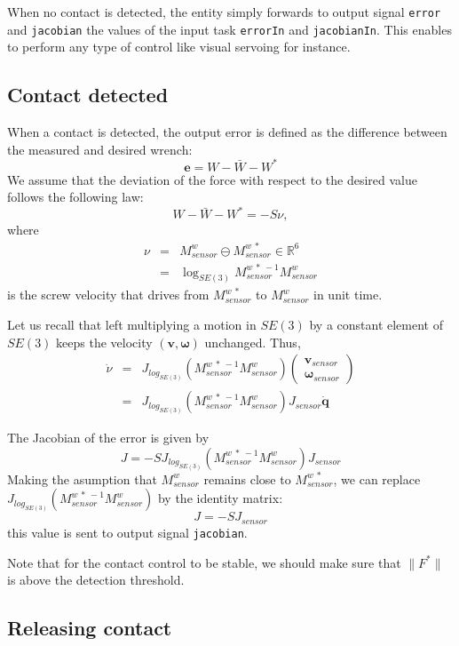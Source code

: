 \documentclass{article}
\newcommand{\oM}[2]{M^{#1}_{#2}}
\newcommand\wrench{W}
\newcommand\wrenchdes{W^{*}}
\newcommand\wrenchOffset{\bar{W}}
\newcommand\resultantdes{F^{*}}
\newcommand\dconf{\mathbf{\dot{q}}}
\begin{document}
When no contact is detected, the entity simply forwards to output signal
\texttt{error} and \texttt{jacobian} the values of the input task \texttt{errorIn} and \texttt{jacobianIn}. This enables to perform any type of control like visual servoing for instance.

\subsection{Contact detected}\label{subsec:contact detected}

When a contact is detected, the output error is defined as the difference between the measured and desired wrench:
$$
\bm{e} = \wrench - \wrenchOffset - \wrenchdes
$$
We assume that the deviation of the force with respect to the desired value follows the following law:
$$
\wrench - \wrenchOffset - \wrenchdes = -S\nu,
$$
where
\begin{eqnarray*}
  \nu &=& \oM{w}{sensor} \ominus \oM{w\ *}{sensor}\in\mathbb{R}^{6}\\
  &=& \log_{SE(3)} \oM{w\ *\ -1}{sensor} \oM{w}{sensor}
\end{eqnarray*}
is the screw velocity that drives from $\oM{w\ *}{sensor}$ to $\oM{w}{sensor}$ in unit time.

Let us recall that left multiplying a motion in $SE(3)$ by a constant element of $SE(3)$ keeps the velocity $(\mathbf{v},\bm{\omega})$ unchanged. Thus,
\begin{eqnarray*}
  \dot{\nu} &=& J_{log_{SE(3)}}(\oM{w\ *\ -1}{sensor} \oM{w}{sensor})\left(\begin{array}{c}\mathbf{v}_{sensor}\\ \bm{\omega}_{sensor}\end{array}\right)\\
  &=& J_{log_{SE(3)}}(\oM{w\ *\ -1}{sensor} \oM{w}{sensor}) J_{sensor}\dconf
\end{eqnarray*}

The Jacobian of the error is given by
$$
J = -S J_{log_{SE(3)}}(\oM{w\ *\ -1}{sensor} \oM{w}{sensor}) J_{sensor}
$$
Making the asumption that $\oM{w}{sensor}$ remains close to $\oM{w\ *}{sensor}$, we can replace $J_{log_{SE(3)}}(\oM{w\ *\ -1}{sensor} \oM{w}{sensor})$ by the identity matrix:
$$
J = -S J_{sensor}
$$
this value is sent to output signal \texttt{jacobian}.

Note that for the contact control to be stable, we should make sure that
$\|\resultantdes\|$ is above the detection threshold.

\subsection{Releasing contact}
\end{document}
